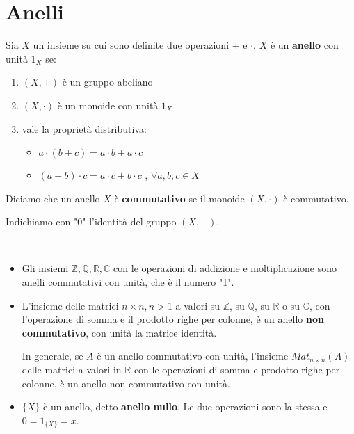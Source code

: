 \documentclass[../main.tex]{subfiles}
\begin{document}
\section{Anelli}

\begin{definition}[Anello]
    Sia $X$ un insieme su cui sono definite due operazioni $+$ e $\cdot $. $X$ è un \textbf{anello} con unità $1_X$ se:
    \begin{enumerate}[label=(\roman*)]
        \item $(X, +)$ è un gruppo abeliano
        \item $(X, \cdot)$ è un monoide con unità $1_X$
        \item vale la proprietà distributiva:
              \begin{itemize}
                  \item $a \cdot (b+c) = a \cdot b + a \cdot c$
                  \item $(a+b) \cdot c = a \cdot c + b \cdot c$ , $\forall a,b,c \in X$
              \end{itemize}
    \end{enumerate}
\end{definition}

\begin{definition}
    Diciamo che un anello $X$ è \textbf{commutativo} se il monoide $(X, \cdot)$ è commutativo.
\end{definition}

Indichiamo con "$0$" l'identità del gruppo $(X, +)$.

\begin{example}
    \
    \begin{itemize}
        \item Gli insiemi $\mathbb{Z} ,\mathbb{Q} ,\mathbb{R} ,\mathbb{C} $ con le operazioni di addizione e moltiplicazione sono anelli commutativi con unità, che è il numero "1".
        \item L'insieme delle matrici $n \times n, n> 1$ a valori su $\mathbb{Z} $, su $\mathbb{Q} $, su $\mathbb{R}$ o su $\mathbb{C} $, con l'operazione di somma e il prodotto righe per colonne, è un anello \textbf{non commutativo}, con unità la matrice identità.

              In generale, se $A$ è un anello commutativo con unità, l'insieme $Mat_{n \times n}(A)$ delle matrici a valori in $\mathbb{R} $ con le operazioni di somma e prodotto righe per colonne, è un anello non commutativo con unità.
        \item$\{X\}$ è un anello, detto \textbf{anello nullo}. Le due operazioni sono la stessa e $0 = 1_{\{X\}} = x$.
    \end{itemize}
\end{example}
\end{document}
